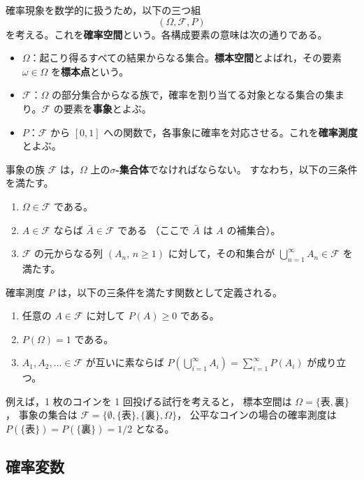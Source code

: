 \documentclass[a4j,dvipdfmx]{jsarticle}
\theoremstyle{plainnote}
\begin{document}
確率現象を数学的に扱うため，以下の三つ組
\[
  (\Omega,\mathcal{F},P)
\]
を考える。これを\textbf{確率空間}という。各構成要素の意味は次の通りである。

\begin{itemize}
  \item $\Omega$：起こり得るすべての結果からなる集合。\textbf{標本空間}とよばれ，その要素 $\omega \in \Omega$ を\textbf{標本点}という。
  \item $\mathcal{F}$：$\Omega$ の部分集合からなる族で，確率を割り当てる対象となる集合の集まり。$\mathcal{F}$ の要素を\textbf{事象}とよぶ。
  \item $P$：$\mathcal{F}$ から $[0,1]$ への関数で，各事象に確率を対応させる。これを\textbf{確率測度}とよぶ。
\end{itemize}

事象の族 $\mathcal{F}$ は，$\Omega$ 上の\textbf{$\sigma$-集合体}でなければならない。
すなわち，以下の三条件を満たす。
\begin{enumerate}
  \item $\Omega\in\mathcal{F}$ である。
  \item $A\in\mathcal{F}$ ならば $\bar{A}\in\mathcal{F}$ である
        （ここで $\bar{A}$ は $A$ の補集合）。
  \item $\mathcal{F}$ の元からなる列 $(A_n,\,n\geq 1)$ に対して，その和集合が
        $\displaystyle\bigcup_{n=1}^{\infty}A_n\in\mathcal{F}$ を満たす。
\end{enumerate}

確率測度 $P$ は，以下の三条件を満たす関数として定義される。
\begin{enumerate}
  \item 任意の $A\in\mathcal{F}$ に対して $P(A)\geq 0$ である。
  \item $P(\Omega)=1$ である。
  \item $A_1,A_2,\ldots \in \mathcal{F}$ が互いに素ならば
        $\displaystyle P\!\left(\bigcup_{i=1}^{\infty} A_i\right)
        =\sum_{i=1}^{\infty}P(A_i)$ が成り立つ。
\end{enumerate}

例えば，1 枚のコインを 1 回投げる試行を考えると，
標本空間は $\Omega=\{\text{表},\text{裏}\}$，
事象の集合は $\mathcal{F}=\{\emptyset,\{\text{表}\},\{\text{裏}\},\Omega\}$，
公平なコインの場合の確率測度は $P(\{\text{表}\})=P(\{\text{裏}\})=1/2$ となる。

\subsection{確率変数}
\end{document}
